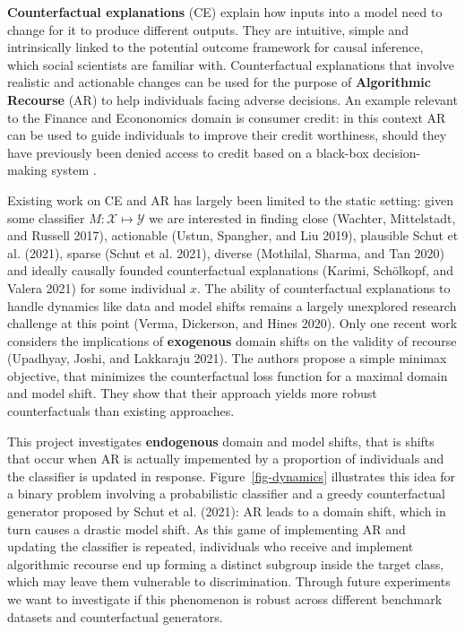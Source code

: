 \documentclass[
]{acmconf}
\begin{document}
\textbf{Counterfactual explanations} (CE) explain how inputs into a
model need to change for it to produce different outputs. They are
intuitive, simple and intrinsically linked to the potential outcome
framework for causal inference, which social scientists are familiar
with. Counterfactual explanations that involve realistic and actionable
changes can be used for the purpose of \textbf{Algorithmic Recourse}
(AR) to help individuals facing adverse decisions. An example relevant
to the Finance and Econonomics domain is consumer credit: in this
context AR can be used to guide individuals to improve their credit
worthiness, should they have previously been denied access to credit
based on a black-box decision-making system .

Existing work on CE and AR has largely been limited to the static
setting: given some classifier \(M: \mathcal{X} \mapsto \mathcal{Y}\) we
are interested in finding close (Wachter, Mittelstadt, and Russell
2017), actionable (Ustun, Spangher, and Liu 2019), plausible Schut et
al. (2021), sparse (Schut et al. 2021), diverse (Mothilal, Sharma, and
Tan 2020) and ideally causally founded counterfactual explanations
(Karimi, Schölkopf, and Valera 2021) for some individual \(x\). The
ability of counterfactual explanations to handle dynamics like data and
model shifts remains a largely unexplored research challenge at this
point (Verma, Dickerson, and Hines 2020). Only one recent work considers
the implications of \textbf{exogenous} domain shifts on the validity of
recourse (Upadhyay, Joshi, and Lakkaraju 2021). The authors propose a
simple minimax objective, that minimizes the counterfactual loss
function for a maximal domain and model shift. They show that their
approach yields more robust counterfactuals than existing approaches.

This project investigates \textbf{endogenous} domain and model shifts,
that is shifts that occur when AR is actually impemented by a proportion
of individuals and the classifier is updated in response.
Figure~\ref{fig-dynamics} illustrates this idea for a binary problem
involving a probabilistic classifier and a greedy counterfactual
generator proposed by Schut et al. (2021): AR leads to a domain shift,
which in turn causes a drastic model shift. As this game of implementing
AR and updating the classifier is repeated, individuals who receive and
implement algorithmic recourse end up forming a distinct subgroup inside
the target class, which may leave them vulnerable to discrimination.
Through future experiments we want to investigate if this phenomenon is
robust across different benchmark datasets and counterfactual
generators.
\end{document}
